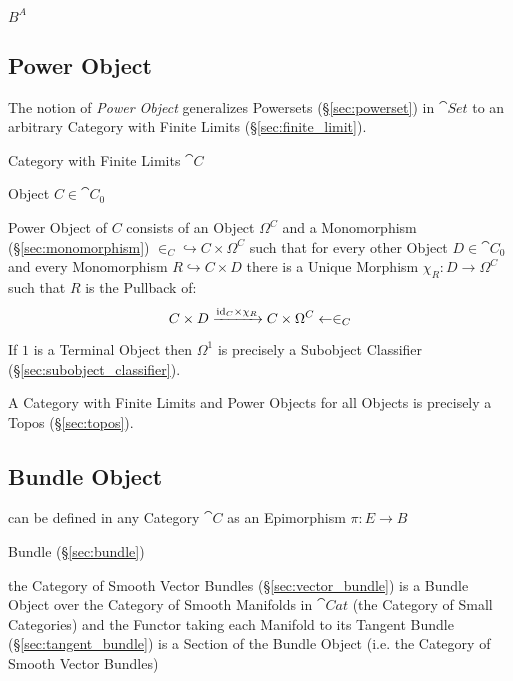 $B^A$



\subsection{Power Object}\label{sec:power_object}

The notion of \emph{Power Object} generalizes Powersets
(\S\ref{sec:powerset}) in $\cat{Set}$ to an arbitrary Category with
Finite Limits (\S\ref{sec:finite_limit}).

Category with Finite Limits $\cat{C}$

Object $C \in \cat{C}_0$

Power Object of $C$ consists of an Object $\Omega^C$ and a
Monomorphism (\S\ref{sec:monomorphism}) $\in_C \hookrightarrow C
\times \Omega^C$ such that for every other Object $D \in \cat{C}_0$
and every Monomorphism $R \hookrightarrow C \times D$ there is a
Unique Morphism $\chi_R : D \rightarrow \Omega^C$ such that $R$ is the
Pullback of:
\[
  C \times D \xrightarrow{\mathrm{id}_C \times \chi_R} C \times \Omega^C
    \leftarrow \in_C
\]

If $1$ is a Terminal Object then $\Omega^1$ is precisely a Subobject
Classifier (\S\ref{sec:subobject_classifier}).

A Category with Finite Limits and Power Objects for all Objects is
precisely a Topos (\S\ref{sec:topos}).



\subsection{Bundle Object}\label{sec:bundle_object}

can be defined in any Category $\cat{C}$ as an Epimorphism $\pi : E \rightarrow
B$

Bundle (\S\ref{sec:bundle})

the Category of Smooth Vector Bundles (\S\ref{sec:vector_bundle}) is a Bundle
Object over the Category of Smooth Manifolds in $\cat{Cat}$ (the Category of
Small Categories) and the Functor taking each Manifold to its Tangent Bundle
(\S\ref{sec:tangent_bundle}) is a Section of the Bundle Object (i.e. the
Category of Smooth Vector Bundles)



